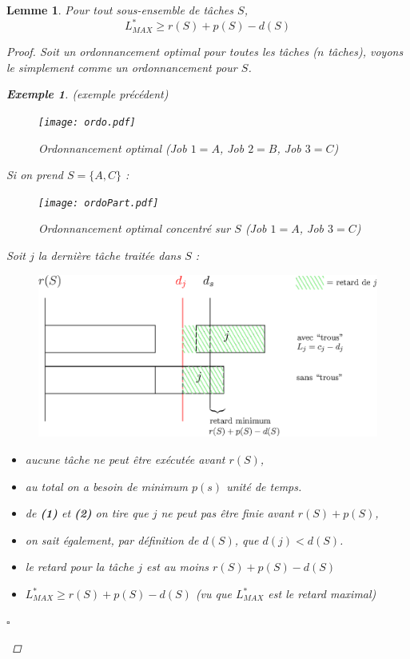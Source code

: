 \documentclass[12pt]{article}
\newcommand{\cqfd}{\begin{flushright}$\square$\end{flushright}}
\newtheorem{exemple}{Exemple}[section]
\newtheorem{lemme}{Lemme}[section]
\newtheorem{proof}{Preuve}[section]
\begin{document}
\begin{lemme} Pour tout sous-ensemble de tâches $S$,
$$ L^*_{MAX} \geq r(S) + p(S) - d(S) $$
\begin{proof}
Soit un ordonnancement optimal pour toutes les tâches ($n$ tâches), voyons le
simplement comme un ordonnancement pour $S$.

\begin{exemple} (exemple précédent)
\begin{figure}[H]
    \begin{center}
    \texttt{[image: ordo.pdf]}
    \caption{Ordonnancement optimal \textit{(Job $1 = A$, Job $2 = B$,
    Job $3 = C$)}}
    \end{center}
\end{figure}

Si on prend $S = \{A,C\}$ :
\begin{figure}[H]
    \begin{center}
    \texttt{[image: ordoPart.pdf]}
    \caption{Ordonnancement optimal concentré sur $S$ \textit{(Job $1 = A$,
    Job $3 = C$)}}
    \end{center}
\end{figure}
\end{exemple}
Soit $j$ la dernière tâche traitée dans $S$ :
 \begin{figure}[H]
 	\centering
 	\includegraphics{ordo.eps}
 \end{figure}
\begin{itemize}
	\item[\textbf{(1)}] aucune tâche ne peut être exécutée avant $r(S)$,
	\item[\textbf{(2)}] au total on a besoin de minimum $p(s)$ unité de temps.
	\item[$\rightarrow$] de \textbf{(1)} et \textbf{(2)} on tire que $j$ ne peut
    pas être finie avant $r(S)+p(S)$,
  	\item[$\rightarrow$] on sait également, par définition de $d(S)$, que
    $d(j) < d(S)$.
  	\item[$\rightarrow$] le retard pour la tâche $j$ est au moins
    $r(S)+p(S) - d(S)$
  	\item[$\hookrightarrow$] $L^*_{MAX} \geq r(S)+p(S)-d(S)$ (vu que
    $L^*_{MAX}$ est le retard maximal)
 \end{itemize}
 \cqfd
\end{proof}
\end{lemme}
\end{document}

